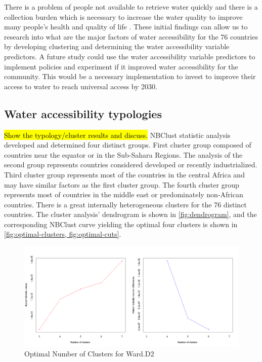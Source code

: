 \documentclass[10pt,twoside]{article}
\numberwithin{equation}{section}
\newcommand{\?}{\stackrel{?}{=}}
\begin{document}
There is a problem of people not available to retrieve water quickly and there is a collection burden which is necessary to increase the water quality to improve many people's health and quality of life \citep{cassivi2018access}. These initial findings can allow us to research into what are the major factors of water accessibility for the 76 countries by developing clustering and determining the water accessibility variable predictors. A future study could use the water accessibility variable predictors to implement policies and experiment if it improved water accessibility for the community. This would be a necessary implementation to invest to improve their access to water to reach universal access by 2030.



\subsection*{Water accessibility typologies}
\hl{Show the typology/cluster results and discuss.}
NBClust statistic analysis developed and determined four distinct groups. First cluster group composed of countries near the equator or in the Sub-Sahara Regions. The analysis of the second group represents countries considered developed or recently industrialized. Third cluster group represents most of the countries in the central Africa and may have similar factors as the first cluster group. The fourth cluster group represents most of countries in the middle east or predominately non-African countries. There is a great internally heterogeneous clusters for the 76 distinct countries. The cluster analysis' dendrogram is shown in \autoref{fig:dendrogram}, and the corresponding NBClust curve yielding the optimal four clusters is shown in \autoref{fig:optimal-clusters, fig:optimal-cuts}.


\begin{figure}[h!]
  \centering
  \includegraphics[width=.7\textwidth]{optimal-clusters-ward-d2}
  \caption{Optimal Number of Clusters for Ward.D2}
  \label{fig:optimal-clusters}
\end{figure}
\end{document}
